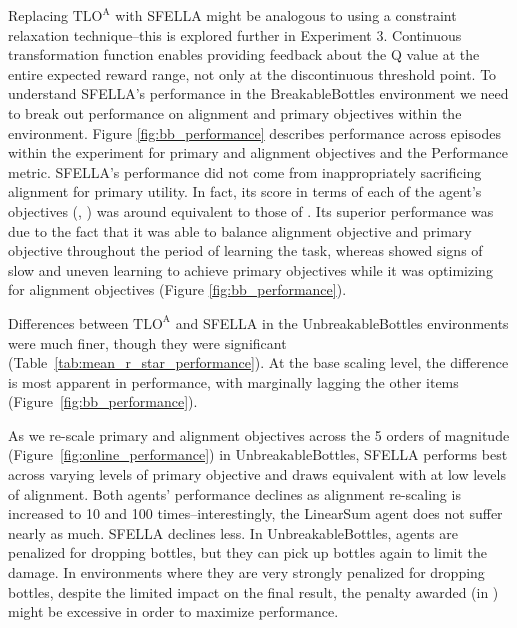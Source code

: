 Replacing $\text{TLO}^\text{A}$ with SFELLA might be analogous to using a constraint relaxation technique--this is explored further in Experiment 3. %
Continuous transformation function enables providing feedback about the \RA{} Q value at the entire expected reward range, not only at the discontinuous threshold point.
To understand SFELLA's performance in the BreakableBottles environment we need to break out performance on alignment and primary objectives within the environment. Figure \ref{fig:bb_performance} describes performance across episodes within the experiment for primary and alignment objectives and the Performance metric. SFELLA's performance did not come from inappropriately sacrificing alignment for primary utility. In fact, its score in terms of each of the agent's objectives (\RP{}, \RA{}) was around equivalent to those of \tloA{}. Its superior \RStar{} performance was due to the fact that it was able to balance alignment objective and primary objective throughout the period of learning the task, whereas \tloA{} showed signs of slow and uneven learning to achieve primary objectives while it was optimizing for alignment objectives (Figure \ref{fig:bb_performance}).

Differences between $\text{TLO}^\text{A}$ and SFELLA in the UnbreakableBottles environments were much finer, though they were significant (Table~\ref{tab:mean_r_star_performance}). At the base scaling level, the difference is most apparent in performance, with \tloA{} marginally lagging the other items (Figure~\ref{fig:bb_performance}). 

As we re-scale primary and alignment objectives across the 5 orders of magnitude (Figure~\ref{fig:online_performance}) in UnbreakableBottles, SFELLA performs best across varying levels of primary objective and draws equivalent with \tloA{} at low levels of alignment. Both agents' performance declines as alignment re-scaling is increased to 10 and 100 times--interestingly, the LinearSum agent does not suffer nearly as much. SFELLA declines less. In UnbreakableBottles, agents are penalized for dropping bottles, but they can pick up bottles again to limit the damage. In environments where they are very strongly penalized for dropping bottles, despite the limited impact on the final result, the penalty awarded (in \RP{}) might be excessive in order to maximize \RStar{} performance.

